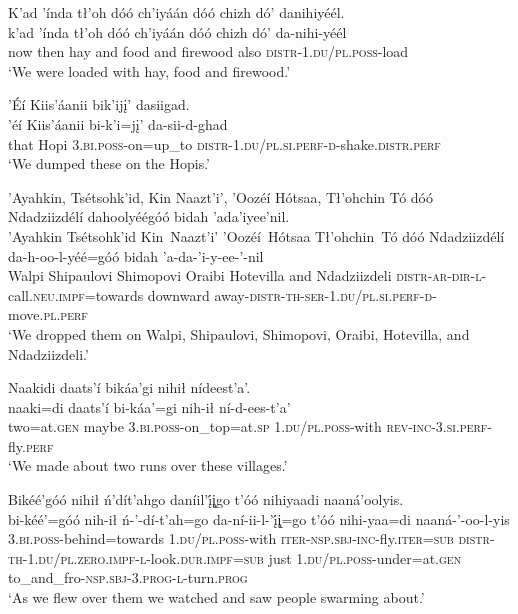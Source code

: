 \ea\label{ex:text9-5-5}
K’ad ’índa tł’oh dóó ch’iyáán dóó chizh dó’ danihiyéél.\\
\gll k’ad	’índa	tł’oh	dóó	ch’iyáán	dóó	chizh	dó’	da-nihi-yéél\\
     now	then	hay	and	food	and	firewood	also	\textsc{distr}-1.\textsc{du}/\textsc{pl}.\textsc{poss}-load\\
\glt `We were loaded with hay, food and firewood.'
\z

\ea\label{ex:text9-5-6}
’Éí Kiis’áanii bik’ijį’ dasiigad.\\
\gll ’éí	Kiis’áanii	bi-k’i=jį’	da-sii-d-ghad\\
     that	Hopi	3.\textsc{bi}.\textsc{poss}-on=up\_to	\textsc{distr}-1.\textsc{du}/\textsc{pl}.\textsc{si}.\textsc{perf}-\textsc{d}-shake.\textsc{distr}.\textsc{perf}\\
\glt `We dumped these on the Hopis.'
\z

\ea\label{ex:text9-5-7}
’Ayahkin, Tsétsohk’id, Kin Naazt’i’, ’Oozéí Hótsaa, Tł’ohchin Tó dóó Ndadziizdélí dahoolyéégóó bidah ’ada’iyee’nil.\\
\gll ’Ayahkin	Tsétsohk’id	Kin~{Naazt’i’}	’Oozéí~{Hótsaa}	Tł’ohchin~{Tó}	dóó	Ndadziizdélí	da-h-oo-l-yéé=góó	bidah	’a-da-’i-y-ee-’-nil\\
     Walpi	Shipaulovi	Shimopovi	Oraibi	Hotevilla	and	Ndadziizdeli	\textsc{distr}-\textsc{ar}-\textsc{dir}-\textsc{l}-call.\textsc{neu}.\textsc{impf}=towards	downward	away-\textsc{distr}-\textsc{th}-\textsc{ser}-1.\textsc{du}/\textsc{pl}.\textsc{si}.\textsc{perf}-\textsc{d}-move.\textsc{pl}.\textsc{perf}\\
\glt `We dropped them on Walpi, Shipaulovi, Shimopovi, Oraibi, Hotevilla, and Ndadziizdeli.'
\z

\ea\label{ex:text9-5-8}
Naakidi daats’í bikáa’gi nihił nídeest’a’.\\
\gll naaki=di	daats’í	bi-káa’=gi	nih-ił	ní-d-ees-t’a’\\
     two=at.\textsc{gen}	maybe	3.\textsc{bi}.\textsc{poss}-on\_top=at.\textsc{sp}	1.\textsc{du}/\textsc{pl}.\textsc{poss}-with	\textsc{rev}-\textsc{inc}-3.\textsc{si}.\textsc{perf}-fly.\textsc{perf}\\
\glt `We made about two runs over these villages.'
\z

\ea\label{ex:text9-5-9}
Bikéé’góó nihił ń’dít’ahgo daníil’į́į̨go t’óó nihiyaadi naaná’oolyis.\\
\gll bi-kéé’=góó	nih-ił	ń-’-dí-t’ah=go	da-ní-ii-l-’į́į̨=go	t’óó	nihi-yaa=di	naaná-’-oo-l-yis\\
     3.\textsc{bi}.\textsc{poss}-behind=towards	1.\textsc{du}/\textsc{pl}.\textsc{poss}-with	\textsc{iter}-\textsc{nsp}.\textsc{sbj}-\textsc{inc}-fly.\textsc{iter}=\textsc{sub}	\textsc{distr}-\textsc{th}-1.\textsc{du}/\textsc{pl}.\textsc{zero}.\textsc{impf}-\textsc{l}-look.\textsc{dur}.\textsc{impf}=\textsc{sub}	just	1.\textsc{du}/\textsc{pl}.\textsc{poss}-under=at.\textsc{gen}	to\_and\_fro-\textsc{nsp}.\textsc{sbj}-3.\textsc{prog}-\textsc{l}-turn.\textsc{prog}\\
\glt `As we flew over them we watched and saw people swarming about.'
\z

